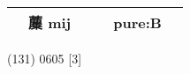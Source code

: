 \documentclass[14pt,a4paper]{scrartcl}
\begin{document}
\begin{longtable}[c]{@{}llllll@{}}
\begin{minipage}[t]{0.14\columnwidth}
\strut\end{minipage} &
\begin{minipage}[t]{0.14\columnwidth}\raggedright\strut
蘪 mij
\strut\end{minipage} &
\begin{minipage}[t]{0.14\columnwidth}\raggedright\strut
\strut\end{minipage} &
\begin{minipage}[t]{0.14\columnwidth}\raggedright\strut
\strut\end{minipage} &
\begin{minipage}[t]{0.14\columnwidth}\raggedright\strut
pure:B
\strut\end{minipage}\tabularnewline
\bottomrule
\end{longtable}

(131) 0605 {[}3{]}
\end{document}
